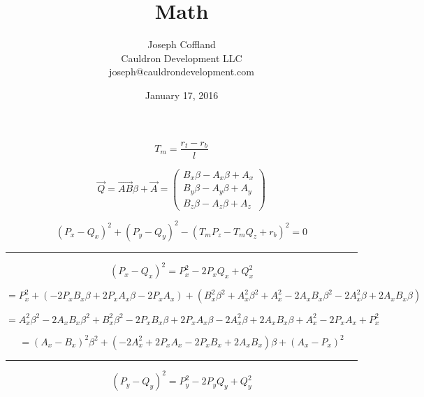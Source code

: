 \documentclass{article}
\title{
  Math
}
\date{January 17, 2016}
\author{
  Joseph Coffland\\
  Cauldron Development LLC\\
  joseph@cauldrondevelopment.com
}
\begin{document}
\maketitle


\begin{equation}
T_m = \frac{r_t-r_b}{l}
\end{equation}

\begin{equation}
\vec{Q} =
\vec{AB}\beta + \vec{A} =
\begin{pmatrix}
  B_x\beta - A_x\beta + A_x \\
  B_y\beta - A_y\beta + A_y \\
  B_z\beta - A_z\beta + A_z
\end{pmatrix}
\end{equation}

\begin{equation}
(P_x - Q_x)^2 + (P_y - Q_y)^2 - (T_mP_z - T_mQ_z + r_b)^2 = 0
\end{equation}

\rule{\textwidth}{1pt}

\begin{equation*}
(P_x - Q_x)^2 = P_x^2 - 2P_xQ_x + Q_x^2
\end{equation*}

\begin{equation*}
  =P_x^2 +
  (-2P_xB_x\beta
  +2P_xA_x\beta
  -2P_xA_x) +
  (B_x^2\beta^2
  +A_x^2\beta^2
  +A_x^2
  -2A_xB_x\beta^2
  -2A_x^2\beta
  +2A_xB_x\beta)
\end{equation*}

\begin{equation*}
  =A_x^2\beta^2
  -2A_xB_x\beta^2
  +B_x^2\beta^2
  -2P_xB_x\beta
  +2P_xA_x\beta
  -2A_x^2\beta
  +2A_xB_x\beta
  +A_x^2
  -2P_xA_x
  +P_x^2
\end{equation*}

\begin{equation*}
= (A_x - B_x)^2\beta^2 +
  (-2A_x^2 + 2P_xA_x - 2P_xB_x + 2A_xB_x)\beta +
  (A_x - P_x)^2
\end{equation*}

\rule{\textwidth}{1pt}

\begin{equation*}
(P_y - Q_y)^2 = P_y^2 - 2P_yQ_y + Q_y^2
\end{equation*}
\end{document}
